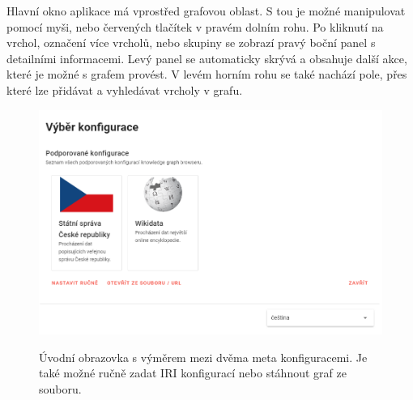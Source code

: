 Hlavní okno aplikace má vprostřed grafovou oblast. S tou je možné manipulovat pomocí myši, nebo červených tlačítek v pravém dolním rohu. Po kliknutí na vrchol, označení více vrcholů, nebo skupiny se zobrazí pravý boční panel s detailními informacemi. Levý panel se automaticky skrývá a obsahuje další akce, které je možné s grafem provést. V levém horním rohu se také nachází pole, přes které lze přidávat a vyhledávat vrcholy v grafu.

\begin{figure}[h]
    \centering
    \includegraphics[width=\textwidth]{media/metaconfiguration.png}\\
    \caption{Úvodní obrazovka s výměrem mezi dvěma meta konfiguracemi. Je také možné ručně zadat IRI konfigurací nebo stáhnout graf ze souboru.}
\end{figure}

\newpage

